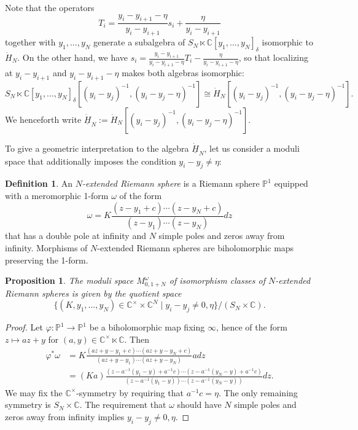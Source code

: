 \documentclass[11pt]{report}
\newtheorem{prop}[theorem]{Proposition}
\theoremstyle{definition}
\newtheorem{definition}[theorem]{Definition}
\theoremstyle{remark}
\theoremstyle{remark}
\newcommand{\C}{\mathbb{C}}
\renewcommand{\P}{\mathbb{P}}
\begin{document}
Note that the operators
\begin{equation*}
T_i = \frac{y_i-y_{i+1}-\eta}{y_i-y_{i+1}} s_i + \frac{\eta}{y_i-y_{i+1}}
\end{equation*}
together with $y_1,...,y_N$ generate a subalgebra of $S_N \ltimes \C[y_1,...,y_N]_\delta$ isomorphic to $\dot H_N$. On the other hand, we have $s_i = \frac{y_i-y_{i+1}}{y_i-y_{i+1}-\eta} T_i - \frac{\eta}{y_i-y_{i+1}-\eta}$, so that localizing at $y_i-y_{i+1}$ and $y_i-y_{i+1}-\eta$ makes both algebras isomorphic:
\begin{equation*}
S_N \ltimes \C[y_1,...,y_N]_\delta[(y_i-y_j)^{-1},(y_i-y_j-\eta)^{-1}] \cong \dot H_N[(y_i-y_j)^{-1},(y_i-y_j-\eta)^{-1}].
\end{equation*}
We henceforth write $\dot{\underline{H}}_N := \dot H_N[(y_i-y_j)^{-1},(y_i-y_j-\eta)^{-1}]$.

To give a geometric interpretation to the algebra $\dot{\underline{H}}_N$, let us consider a moduli space that additionally imposes the condition $y_i-y_j \neq \eta$:

\begin{definition}
An \emph{$N$-extended Riemann sphere} is a Riemann sphere $\P^1$ equipped with a meromorphic 1-form $\omega$ of the form
\begin{equation*}
\omega
= K \frac{(z-y_1+c) \cdots (z-y_N+c)}{(z-y_1) \cdots (z-y_N)} dz
\end{equation*}
that has a double pole at infinity and $N$ simple poles and zeros away from infinity. Morphisms of $N$-extended Riemann spheres are biholomorphic maps preserving the 1-form.
\end{definition}

\begin{prop}
The moduli space $M_{0,1+N}^\omega$ of isomorphism classes of $N$-extended Riemann spheres is given by the quotient space
\begin{equation*}
\{ (K, y_1,...,y_N) \in \C^\times \times \C^N \mid y_i-y_j \neq 0,\eta \}/(S_N \times \C).
\end{equation*}
\end{prop}

\begin{proof}
Let $\varphi: \P^1 \to \P^1$ be a biholomorphic map fixing $\infty$, hence of the form $z \mapsto az+y$ for $(a,y) \in \C^\times \ltimes \C$. Then
\begin{align*}
\varphi^* \omega
&= K \frac{(az+y-y_1+c) \cdots (az+y-y_N+c)}{(az+y-y_1) \cdots (az+y-y_N)} a dz \\
&= (Ka) \frac{(z-a^{-1}(y_1-y)+a^{-1}c) \cdots (z-a^{-1}(y_N-y)+a^{-1}c)}{(z-a^{-1}(y_1-y)) \cdots (z-a^{-1}(y_N-y))}dz.
\end{align*}
We may fix the $\C^\times$-symmetry by requiring that $a^{-1}c = \eta$. The only remaining symmetry is $S_N \times \C$. The requirement that $\omega$ should have $N$ simple poles and zeros away from infinity implies $y_i-y_j \neq 0,\eta$.
\end{proof}
\end{document}
